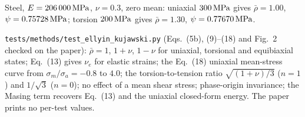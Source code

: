  Steel, $E=206\,000\,\mathrm{MPa}$, $\nu=0.3$, zero mean: uniaxial $300\,\mathrm{MPa}$ gives
$\bar\rho=1.00$, $\psi=0.75728\,\mathrm{MPa}$; torsion $200\,\mathrm{MPa}$ gives $\bar\rho=1.30$, $\psi=0.77670\,\mathrm{MPa}$.

 \texttt{tests/methods/test\_ellyin\_kujawski.py} (Eqs.~(5b), (9)--(18) and
Fig.~2 checked on the paper): $\bar\rho=1$, $1+\nu$, $1-\nu$ for uniaxial, torsional and equibiaxial states; Eq.~(13)
gives $\nu_e$ for elastic strains; the Eq.~(18) uniaxial mean-stress curve from
$\sigma_m/\sigma_a=-0.8$ to $4.0$; the torsion-to-tension ratio $\sqrt{(1+\nu)/3}$ ($n=1$) and
$1/\sqrt3$ ($n=0$); no effect of a mean shear stress; phase-origin invariance; the Masing term
recovers Eq.~(13) and the uniaxial closed-form energy. The paper prints no per-test values.
